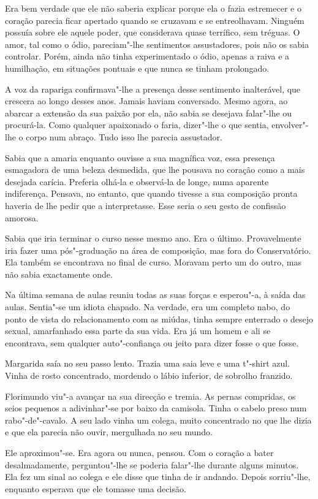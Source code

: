 Era bem verdade que ele não saberia explicar porque ela o fazia
estremecer e o coração parecia ficar apertado quando se cruzavam e se
entreolhavam. Ninguém possuía sobre ele aquele poder, que considerava
quase terrífico, sem tréguas. O amor, tal como o ódio, pareciam"-lhe
sentimentos assustadores, pois não os sabia controlar. Porém, ainda não
tinha experimentado o ódio, apenas a raiva e a humilhação, em situações
pontuais e que nunca se tinham prolongado.

A voz da rapariga confirmava"-lhe a presença desse sentimento
inalterável, que crescera ao longo desses anos. Jamais haviam
conversado. Mesmo agora, ao abarcar a extensão da sua paixão por ela,
não sabia se desejava falar"-lhe ou procurá-la. Como qualquer apaixonado
o faria, dizer"-lhe o que sentia, envolver"-lhe o corpo num abraço. Tudo
isso lhe parecia assustador.

Sabia que a amaria enquanto ouvisse a sua magnífica voz, essa presença
esmagadora de uma beleza desmedida, que lhe pousava no coração como a
mais desejada carícia. Preferia olhá-la e observá-la de longe, numa
aparente indiferença. Pensava, no entanto, que quando tivesse a sua
composição pronta haveria de lhe pedir que a interpretasse. Esse seria o
seu gesto de confissão amorosa.

Sabia que iria terminar o curso nesse mesmo ano. Era o último.
Provavelmente iria fazer uma pós"-graduação na área de composição, mas
fora do Conservatório. Ela também se encontrava no final de curso.
Moravam perto um do outro, mas não sabia exactamente onde.

Na última semana de aulas reuniu todas as suas forças e esperou"-a, à
saída das aulas. Sentia"-se um idiota chapado. Na verdade, era um
completo nabo, do ponto de vista do relacionamento com as miúdas, tinha
sempre enterrado o desejo sexual, amarfanhado essa parte da sua vida.
Era já um homem e ali se encontrava, sem qualquer auto"-confiança ou
jeito para dizer fosse o que fosse.

Margarida saía no seu passo lento. Trazia uma saia leve e uma t"-shirt
azul. Vinha de rosto concentrado, mordendo o lábio inferior, de sobrolho
franzido.

Florimundo viu"-a avançar na sua direcção e tremia. As pernas compridas,
os seios pequenos a adivinhar"-se por baixo da camisola. Tinha o cabelo
preso num rabo"-de"-cavalo. A seu lado vinha um colega, muito concentrado
no que lhe dizia e que ela parecia não ouvir, mergulhada no seu mundo.

Ele aproximou"-se. Era agora ou nunca, pensou. Com o coração a bater
desalmadamente, perguntou"-lhe se poderia falar"-lhe durante alguns
minutos. Ela fez um sinal ao colega e ele disse que tinha de ir andando.
Depois sorriu"-lhe, enquanto esperava que ele tomasse uma decisão.


